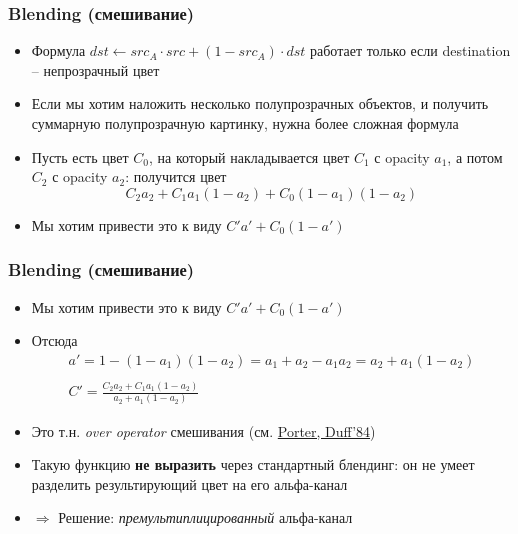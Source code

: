\documentclass[10pt]{beamer}
\begin{document}
\begin{frame}[fragile]
\frametitle{Blending (смешивание)}
\begin{itemize}
\item Формула \begin{math}
dst \leftarrow src_A \cdot src + (1 - src_A) \cdot dst
\end{math} работает только если destination -- непрозрачный цвет
\pause
\item Если мы хотим наложить несколько полупрозрачных объектов, и получить суммарную полупрозрачную картинку, нужна более сложная формула
\pause
\item Пусть есть цвет \begin{math}C_0\end{math}, на который накладывается цвет \begin{math}C_1\end{math} с opacity \begin{math}a_1\end{math}, а потом \begin{math}C_2\end{math} с opacity \begin{math}a_2\end{math}: получится цвет
\pause
\begin{equation*}
C_2a_2 + C_1a_1(1-a_2) + C_0(1-a_1)(1-a_2)
\end{equation*}
\pause
\item Мы хотим привести это к виду \begin{math}C'a' + C_0(1-a')\end{math}
\end{itemize}
\end{frame}

\begin{frame}[fragile]
\frametitle{Blending (смешивание)}
\begin{itemize}
\item Мы хотим привести это к виду \begin{math}C'a' + C_0(1-a')\end{math}
\pause
\item Отсюда
\begin{equation*}
\begin{matrix}
a' = 1-(1-a_1)(1-a_2) = a_1+a_2-a_1a_2=a_2+a_1(1-a_2) \\
\\
C' = \frac{C_2a_2+C_1a_1(1-a_2)}{a_2+a_1(1-a_2)}
\end{matrix}
\end{equation*}
\pause
\item Это т.н. \textit{over operator} смешивания (см. \href{https://graphics.pixar.com/library/Compositing/paper.pdf}{Porter, Duff'84})
\pause
\item Такую функцию \textbf{не выразить} через стандартный блендинг: он не умеет разделить результирующий цвет на его альфа-канал
\pause
\item \begin{math}\Longrightarrow\end{math} Решение: \textit{премультиплицированный} альфа-канал
\end{itemize}
\end{frame}
\end{document}

